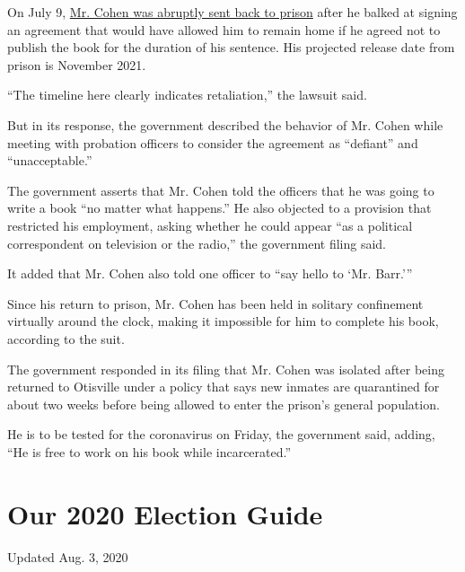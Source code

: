 On July 9,
\href{https://www.nytimes3xbfgragh.onion/2020/07/09/nyregion/michael-cohen-arrested.html}{Mr.
Cohen was abruptly sent back to prison} after he balked at signing an
agreement that would have allowed him to remain home if he agreed not to
publish the book for the duration of his sentence. His projected release
date from prison is November 2021.

``The timeline here clearly indicates retaliation,'' the lawsuit said.

But in its response, the government described the behavior of Mr. Cohen
while meeting with probation officers to consider the agreement as
``defiant'' and ``unacceptable.''

The government asserts that Mr. Cohen told the officers that he was
going to write a book ``no matter what happens.'' He also objected to a
provision that restricted his employment, asking whether he could appear
``as a political correspondent on television or the radio,'' the
government filing said.

It added that Mr. Cohen also told one officer to ``say hello to `Mr.
Barr.'''

Since his return to prison, Mr. Cohen has been held in solitary
confinement virtually around the clock, making it impossible for him to
complete his book, according to the suit.

The government responded in its filing that Mr. Cohen was isolated after
being returned to Otisville under a policy that says new inmates are
quarantined for about two weeks before being allowed to enter the
prison's general population.

He is to be tested for the coronavirus on Friday, the government said,
adding, ``He is free to work on his book while incarcerated.''

\hypertarget{our-2020-election-guide}{%
\section{Our 2020 Election Guide}\label{our-2020-election-guide}}

Updated Aug. 3, 2020

